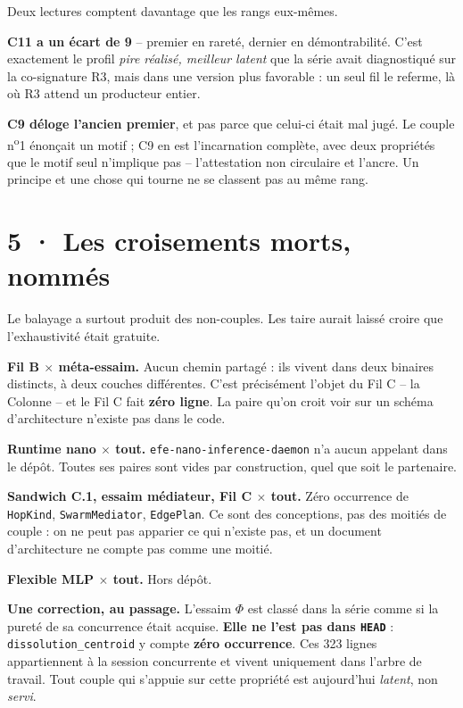\documentclass[10pt]{article}
\newcommand{\code}[1]{\texttt{\small #1}}
\newcommand{\x}{$\times$}
\begin{document}
Deux lectures comptent davantage que les rangs eux-mêmes.

\textbf{C11 a un écart de 9} -- premier en rareté, dernier en démontrabilité. C'est exactement le profil
\emph{pire réalisé, meilleur latent} que la série avait diagnostiqué sur la co-signature R3, mais dans
une version plus favorable : un seul fil le referme, là où R3 attend un producteur entier.

\textbf{C9 déloge l'ancien premier}, et pas parce que celui-ci était mal jugé. Le couple
n\textsuperscript{o}1 énonçait un motif ; C9 en est l'incarnation complète, avec deux propriétés que le
motif seul n'implique pas -- l'attestation non circulaire et l'ancre. Un principe et une chose qui
tourne ne se classent pas au même rang.

\section{5 · Les croisements morts, nommés}

Le balayage a surtout produit des non-couples. Les taire aurait laissé croire que l'exhaustivité était
gratuite.

\textbf{Fil B \x{} méta-essaim.} Aucun chemin partagé : ils vivent dans deux binaires distincts, à deux
couches différentes. C'est précisément l'objet du Fil C -- la Colonne -- et le Fil C fait \textbf{zéro
ligne}. La paire qu'on croit voir sur un schéma d'architecture n'existe pas dans le code.

\textbf{Runtime nano \x{} tout.} \code{efe-nano-inference-daemon} n'a aucun appelant dans le dépôt.
Toutes ses paires sont vides par construction, quel que soit le partenaire.

\textbf{Sandwich C.1, essaim médiateur, Fil C \x{} tout.} Zéro occurrence de \code{HopKind},
\code{SwarmMediator}, \code{EdgePlan}. Ce sont des conceptions, pas des moitiés de couple : on ne peut
pas apparier ce qui n'existe pas, et un document d'architecture ne compte pas comme une moitié.

\textbf{Flexible MLP \x{} tout.} Hors dépôt.

\begin{alerte}
\textbf{Une correction, au passage.} L'essaim $\Phi$ est classé dans la série comme si la pureté de sa
concurrence était acquise. \textbf{Elle ne l'est pas dans \code{HEAD}} : \code{dissolution\_centroid} y
compte \textbf{zéro occurrence}. Ces 323 lignes appartiennent à la session concurrente et vivent
uniquement dans l'arbre de travail. Tout couple qui s'appuie sur cette propriété est aujourd'hui
\emph{latent}, non \emph{servi}.
\end{alerte}
\end{document}
